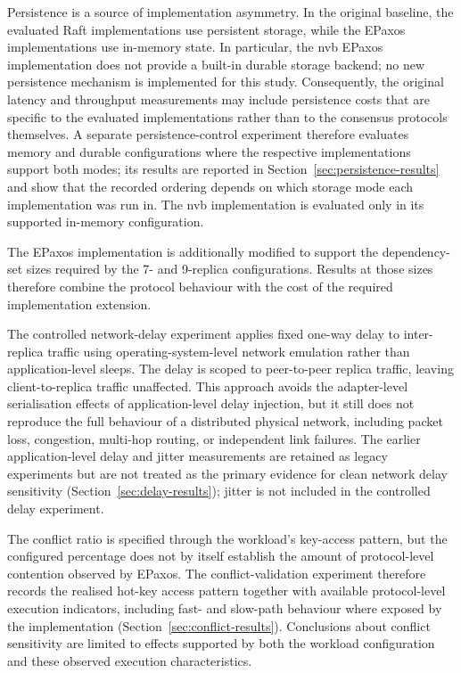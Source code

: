 Persistence is a source of implementation asymmetry. In the original
baseline, the evaluated Raft implementations use persistent storage, while
the EPaxos implementations use in-memory state. In particular, the nvb
EPaxos implementation does not provide a built-in durable storage backend;
no new persistence mechanism is implemented for this study. Consequently,
the original latency and throughput measurements may include persistence
costs that are specific to the evaluated implementations rather than to the
consensus protocols themselves. A separate persistence-control experiment
therefore evaluates memory and durable configurations where the respective
implementations support both modes; its results are reported in
Section~\ref{sec:persistence-results} and show that the recorded ordering
depends on which storage mode each implementation was run in. The nvb
implementation is evaluated only in its supported in-memory configuration.

The EPaxos implementation is additionally modified to support the
dependency-set sizes required by the 7- and 9-replica configurations.
Results at those sizes therefore combine the protocol behaviour with the
cost of the required implementation extension.

The controlled network-delay experiment applies fixed one-way delay to
inter-replica traffic using operating-system-level network emulation rather
than application-level sleeps. The delay is scoped to peer-to-peer replica
traffic, leaving client-to-replica traffic unaffected. This approach avoids
the adapter-level serialisation effects of application-level delay
injection, but it still does not reproduce the full behaviour of a
distributed physical network, including packet loss, congestion,
multi-hop routing, or independent link failures. The earlier
application-level delay and jitter measurements are retained as legacy
experiments but are not treated as the primary evidence for clean network
delay sensitivity (Section~\ref{sec:delay-results}); jitter is not included
in the controlled delay experiment.

The conflict ratio is specified through the workload's key-access pattern,
but the configured percentage does not by itself establish the amount of
protocol-level contention observed by EPaxos. The conflict-validation
experiment therefore records the realised hot-key access pattern together
with available protocol-level execution indicators, including fast- and
slow-path behaviour where exposed by the implementation
(Section~\ref{sec:conflict-results}). Conclusions about
conflict sensitivity are limited to effects supported by both the workload
configuration and these observed execution characteristics.

